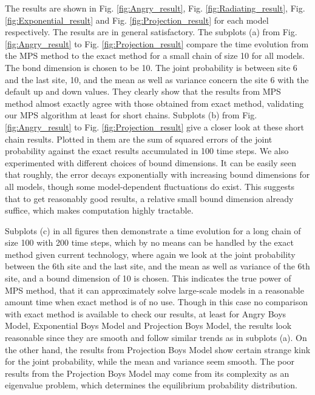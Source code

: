 \documentclass[english]{article}[12pt]
\begin{document}
The results are shown in Fig. \ref{fig:Angry_result}, Fig. \ref{fig:Radiating_result}, Fig. \ref{fig:Exponential_result} and Fig. \ref{fig:Projection_result} for each model respectively. The results are in general satisfactory. The subplots (a) from Fig. \ref{fig:Angry_result} to Fig. \ref{fig:Projection_result} compare the time evolution from the MPS method to the exact method for a small chain of size 10 for all models. The bond dimension is chosen to be 10. The joint probability is between site 6 and the last site, 10, and the mean as well as variance concern the site 6 with the default up and down values. They clearly show that the results from MPS method almost exactly agree with those obtained from exact method, validating our MPS algorithm at least for short chains. Subplots (b) from Fig. \ref{fig:Angry_result} to Fig. \ref{fig:Projection_result} give a closer look at these short chain results. Plotted in them are the sum of squared errors of the joint probability against the exact results accumulated in 100 time steps. We also experimented with different choices of bound dimensions. It can be easily seen that roughly, the error decays exponentially with increasing bound dimensions for all models, though some model-dependent fluctuations do exist. This suggests that to get reasonably good results, a relative small bound dimension already suffice, which makes computation highly tractable. 

Subplots (c) in all figures then demonstrate a time evolution for a long chain of size 100 with 200 time steps, which by no means can be handled by the exact method given current technology, where again we look at the joint probability between the 6th site and the last site, and the mean as well as variance of the 6th site, and a bound dimension of 10 is chosen. This indicates the true power of MPS method, that it can approximately solve large-scale models in a reasonable amount time when exact method is of no use. Though in this case no comparison with exact method is available to check our results, at least for Angry Boys Model, Exponential Boys Model and Projection Boys Model, the results look reasonable since they are smooth and follow similar trends as in subplots (a). On the other hand, the results from Projection Boys Model show certain strange kink for the joint probability, while the mean and variance seem smooth. The poor results from the Projection Boys Model may come from its complexity as an eigenvalue problem, which determines the equilibrium probability distribution. 
\end{document}
